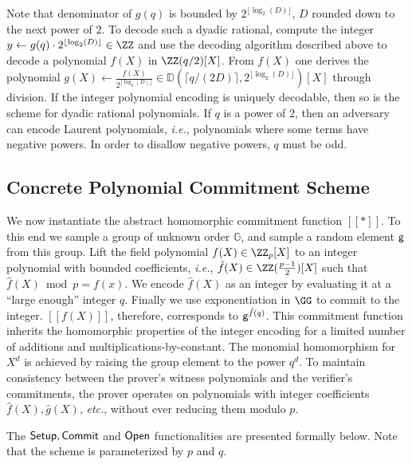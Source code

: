 Note that denominator of $g(q)$ is bounded by $2^{\lfloor\log_2(D)\rfloor}$, $D$ rounded down to the next power of $2$. To decode such a dyadic rational, compute the integer $y \gets g(q) \cdot 2^{\lfloor\log_2(D)\rfloor}\in \ZZ$  and use the decoding algorithm described above to decode a polynomial $f(X)$ in $\ZZ(q/2)[X]$. From $f(X)$ one derives the polynomial  $g(X) \gets \frac{f(X)}{2^{\lfloor\log_2(D)\rfloor}} \in \mathbb{D}(\lceil q/(2D)\rceil, 2^{\lfloor\log_2(D)\rfloor})[X]$ through division. If the integer polynomial encoding is uniquely decodable, then so is the scheme for dyadic rational polynomials. If $q$ is a power of $2$, then an adversary can encode Laurent polynomials, \emph{i.e.}, polynomials where some terms have negative powers. In order to disallow negative powers, $q$ must be odd.

\subsection{Concrete Polynomial Commitment Scheme}

We now instantiate the abstract homomorphic commitment function $[\![ * ]\!]$. To this end we sample a group of unknown order $\mathbb{G}$, and sample a random element $\mathsf{g}$ from this group. 
Lift the field polynomial $f(X)\in \ZZ_p[X]$ to an integer polynomial with bounded coefficients, \emph{i.e.}, $\hat{f}(X)\in \ZZ(\frac{p-1}{2})[X]$ such that $\hat{f}(X)\bmod p=f(x)$.
We encode $\hat{f}(X)$ as an integer by evaluating it at a ``large enough'' integer $q$. Finally we use exponentiation in $\GG$ to commit to the integer. $[\![f(X)]\!]$, therefore, corresponds to $\mathsf{g}^{\hat{f}(q)}$. This commitment function inherits the homomorphic properties of the integer encoding for a limited number of additions and multiplications-by-constant. The monomial homomorphism for $X^d$ is achieved by raising the group element to the power $q^{d}$. To maintain consistency between the prover's witness polynomials and the verifier's commitments, the prover operates on polynomials with integer coefficients  $\hat{f}(X), \hat{g}(X)$, \emph{etc.}, without ever reducing them modulo $p$.

The $\textsf{{Setup}}, \textsf{{Commit}}$ and $\textsf{{Open}}$ functionalities are presented formally below. Note that the scheme is parameterized by $p$ and $q$.


